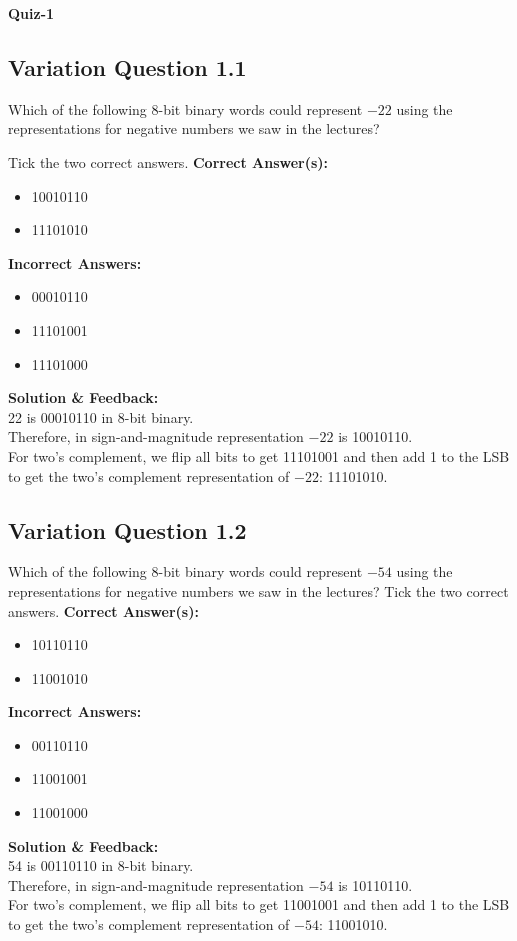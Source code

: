 \textbf{Quiz-1}
\subsection{Variation Question 1.1}
Which of the following 8-bit binary words could represent $-22$ using the representations for negative numbers we saw in the lectures?

Tick the two correct answers.
\textbf{Correct Answer(s):}
\begin{itemize}
    \item 10010110
    \item 11101010
\end{itemize}

\textbf{Incorrect Answers:}
\begin{itemize}
    \item 00010110
    \item 11101001
    \item 11101000
\end{itemize}

\textbf{Solution \& Feedback:}\\
22 is 00010110 in 8-bit binary.\\
Therefore, in sign-and-magnitude representation $-22$ is 10010110.\\
For two’s complement, we flip all bits to get 11101001 and then add 1 to the LSB to get the two’s complement representation of $-22$: 11101010.

\subsection{Variation Question 1.2}

Which of the following 8-bit binary words could represent $-54$ using the representations for negative numbers we saw in the lectures?
Tick the two correct answers.
\textbf{Correct Answer(s):}
\begin{itemize}
    \item 10110110
    \item 11001010
\end{itemize}

\textbf{Incorrect Answers:}
\begin{itemize}
    \item 00110110
    \item 11001001
    \item 11001000
\end{itemize}

\textbf{Solution \& Feedback:}\\
54 is 00110110 in 8-bit binary.\\
Therefore, in sign-and-magnitude representation $-54$ is 10110110.\\
For two’s complement, we flip all bits to get 11001001 and then add 1 to the LSB to get the two’s complement representation of $-54$: 11001010.


